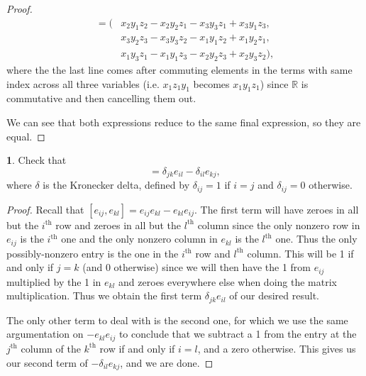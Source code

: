 \documentclass[12pt]{article}
\renewcommand{\th}{^\mathrm{th}}
\theoremstyle{definition}
\newtheorem{ex}{}
\begin{document}
\begin{proof}
\begin{align*}
		=                        ( & x_2y_1z_2 - x_2y_2z_1 - x_3y_3z_1 + x_3y_1z_3,                                                           \\
		                           & x_3y_2z_3 - x_3y_3z_2 - x_1y_1z_2 + x_1y_2z_1,                                                           \\
		                           & x_1y_3z_1 - x_1y_1z_3 - x_2y_2z_3 + x_2y_3z_2),
	\end{align*}
	where the the last line comes after commuting elements in the terms with same index across all three variables (i.e. $x_1z_1y_1$ becomes $x_1y_1z_1$) since $\mathbb{R}$ is commutative and then cancelling them out.

	We can see that both expressions reduce to the same final expression, so they are equal.
\end{proof}

\begin{ex}
	Check that \begin{equation*}
		[e_{ij}, e_{kl}] = \delta_{jk}e_{il}-\delta_{il}e_{kj},
	\end{equation*}
	where $\delta$ is the Kronecker delta, defined by $\delta_{ij} = 1$ if $i = j$ and $\delta_{ij} = 0$ otherwise.
\end{ex}
\begin{proof}
	Recall that $[e_{ij}, e_{kl}] = e_{ij}e_{kl} - e_{kl}e_{ij}$.
	The first term will have zeroes in all but the $i\th$ row and zeroes in all but the $l\th$ column since the only nonzero row in $e_{ij}$ is the $i\th$ one and the only nonzero column in $e_{kl}$ is the $l\th$ one.
	Thus the only possibly-nonzero entry is the one in the $i\th$ row and $l\th$ column.
	This will be 1 if and only if $j = k$ (and 0 otherwise) since we will then have the 1 from $e_{ij}$ multiplied by the 1 in $e_{kl}$ and zeroes everywhere else when doing the matrix multiplication. Thus we obtain the first term $\delta_{jk}e_{il}$ of our desired result.

	The only other term to deal with is the second one, for which we use the same argumentation on $-e_{kl}e_{ij}$ to conclude that we subtract a 1 from the entry at the $j\th$ column of the $k\th$ row if and only if $i = l$, and a zero otherwise.
	This gives us our second term of $-\delta_{il}e_{kj}$, and we are done.
\end{proof}
\end{document}
